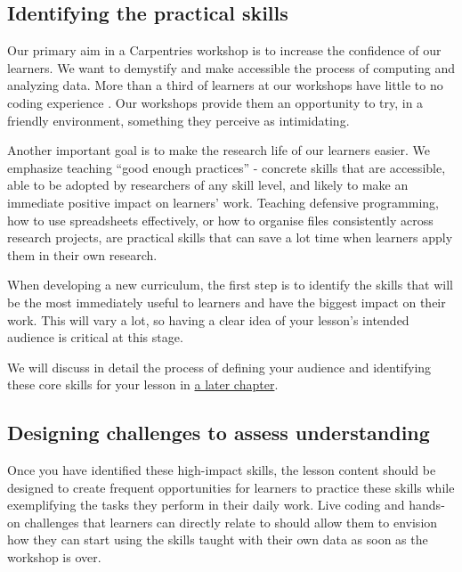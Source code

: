 \documentclass[]{book}
\begin{document}
\hypertarget{identifying-the-practical-skills}{%
\subsection{Identifying the practical skills}\label{identifying-the-practical-skills}}

Our primary aim in a Carpentries workshop is to increase the confidence of our learners. We
want to demystify and make accessible the process of computing and analyzing data. More than
a third of learners at our workshops have little to no coding experience \citep{jordan2018assessment}. Our workshops provide them an
opportunity to try, in a friendly environment, something they perceive as intimidating.

Another important goal is to make the research life of our learners easier. We
emphasize teaching ``good enough practices'' \citep{wilson2017goodenough} - concrete
skills that are accessible, able to be adopted by researchers of any skill
level, and likely to make an immediate positive impact on learners' work.
Teaching defensive programming, how to use spreadsheets effectively, or how to
organise files consistently across research projects, are practical skills that
can save a lot time when learners apply them in their own research.

When developing a new curriculum, the first step is to identify the skills that will be the
most immediately useful to learners and have the biggest impact on their work. This will
vary a lot, so having a clear idea of your lesson's intended audience is critical at this
stage.

We will discuss in detail the process of defining your
audience and identifying these core skills for your lesson
in \protect\hyperlink{deciding-what-to-teach}{a later chapter}.

\hypertarget{designing-challenges-to-assess-understanding}{%
\subsection{Designing challenges to assess understanding}\label{designing-challenges-to-assess-understanding}}

Once you have identified these high-impact skills, the lesson content should be designed to
create frequent opportunities for learners to practice these skills while exemplifying the
tasks they perform in their daily work. Live coding and hands-on challenges that learners
can directly relate to should allow them to envision how they can start using the skills
taught with their own data as soon as the workshop is over.
\end{document}
